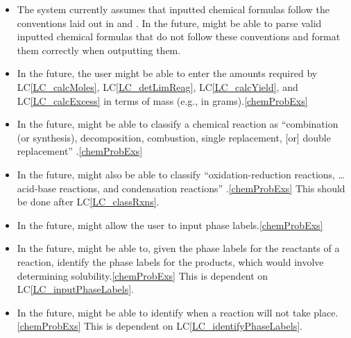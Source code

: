 \documentclass[12pt]{article}
\newcounter{lcnum} %
\newcommand{\lcref}[1]{LC\ref{#1}}
\begin{document}
\begin{itemize}
  \item[LC\refstepcounter{lcnum}\thelcnum\label{LC_incorrectInputFormat}:]
    The system currently assumes that inputted chemical formulas
    follow the conventions laid out in
    \cite{international_union_of_pure_and_applied_chemistry_nomenclature_2005}
    and \cite{international_union_of_pure_and_applied_chemistry_nomenclature_2013}.
    In the future, \progname{} might be able to
    parse valid inputted chemical formulas that do not follow these conventions
    and format them correctly when outputting them.

  \item[LC\refstepcounter{lcnum}\thelcnum\label{LC_termsOfMass}:] In the future,
    the user might be able to enter the amounts required by \lcref{LC_calcMoles},
    \lcref{LC_detLimReag}, \lcref{LC_calcYield}, and \lcref{LC_calcExcess} in
    terms of mass (e.g., in grams).\cref{chemProbExs}

  \item[LC\refstepcounter{lcnum}\thelcnum\label{LC_classRxns}:] In the future,
    \progname{} might be able to classify a chemical reaction as ``combination
    (or synthesis), decomposition, combustion, single replacement, [or] double
    replacement'' \cite[p.~301]{lund_introduction_2023}.\cref{chemProbExs}

  \item[LC\refstepcounter{lcnum}\thelcnum\label{LC_classMoreRxns}:] In the
    future, \progname{} might also be able to classify ``oxidation-reduction
    reactions, \dots acid-base reactions, and condensation reactions''
    \cite[p.~301]{lund_introduction_2023}.\cref{chemProbExs} This should be
    done after \lcref{LC_classRxns}.

  \item[LC\refstepcounter{lcnum}\thelcnum\label{LC_inputPhaseLabels}:] In the
    future, \progname{} might allow the user to input phase
    labels.\cref{chemProbExs}

  \item[LC\refstepcounter{lcnum}\thelcnum\label{LC_identifyPhaseLabels}:] In
    the future, \progname{} might be able to, given the phase labels for the
    reactants of a reaction, identify the phase labels for the products, which
    would involve determining solubility.\cref{chemProbExs} This is dependent
    on \lcref{LC_inputPhaseLabels}.

  \item[LC\refstepcounter{lcnum}\thelcnum\label{LC_rxnTakePlace}:] In the
    future, \progname{} might be able to identify when a reaction will not take
    place.\cref{chemProbExs}
    This is dependent on \lcref{LC_identifyPhaseLabels}.

\end{itemize}
\end{document}
